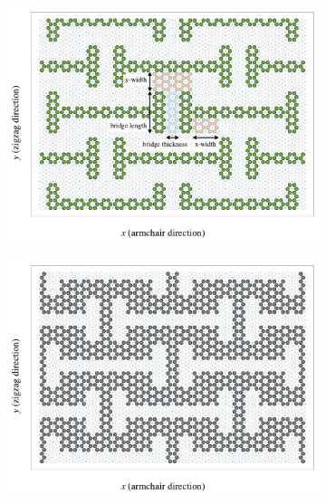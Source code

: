 \begin{figure}[H]
  \centering
  \begin{subfigure}[t]{0.48\textwidth}
      \centering
      \includegraphics[width=\textwidth]{figures/system/honeycomb_inverse.pdf}
      \caption{}
      \label{fig:honeycomb_a}
    \end{subfigure}
    \hfill
    \begin{subfigure}[t]{0.48\textwidth}
      \centering
      \includegraphics[width=\textwidth]{figures/system/honeycomb_pattern.pdf}
      \caption{}
      \label{fig:honeycomb_b}
  \end{subfigure}
  \hfill
     \caption{}
     \label{fig:honeycomb}
\end{figure}


